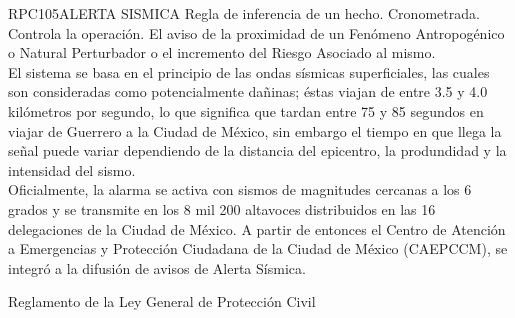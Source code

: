 \begin{BusinessRule}{RPC105}{ALERTA SISMICA}{
		Regla de inferencia de un hecho.
	}{
		Cronometrada. 
	}{
		Controla la operación. %
	}
	\BRItem[Descripción:] El aviso de la proximidad de un Fenómeno Antropogénico o Natural Perturbador o el incremento del Riesgo Asociado al mismo.\\El sistema se basa en el principio de las ondas sísmicas superficiales, las cuales son consideradas como potencialmente dañinas; éstas viajan de entre 3.5 y 4.0 kilómetros por segundo, lo que significa que tardan entre 75 y 85 segundos en viajar de Guerrero a la Ciudad de México, sin embargo el tiempo en que llega la señal puede variar dependiendo de la distancia del epicentro, la produndidad y la intensidad del sismo.\\Oficialmente, la alarma se activa con sismos de magnitudes cercanas a los 6 grados y se transmite en los 8 mil 200 altavoces distribuidos en las 16 delegaciones de la Ciudad de México.
A partir de entonces el Centro de Atención a Emergencias y Protección Ciudadana de la Ciudad de México (CAEPCCM), se integró a la difusión de avisos de Alerta Sísmica.
	
	
	 Reglamento de la Ley General de Protección Civil
\end{BusinessRule}